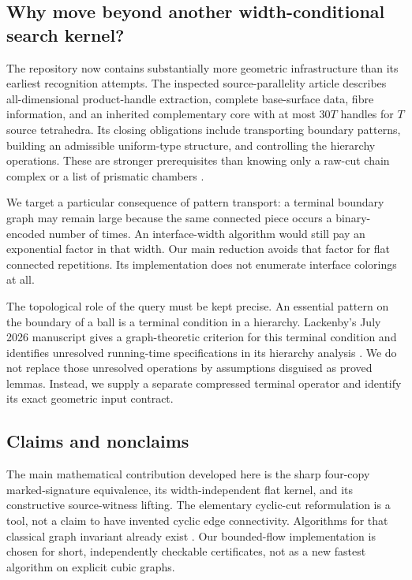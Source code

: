 \documentclass[11pt]{article}
\theoremstyle{remark}\newtheorem{remark}[theorem]{Remark}
\begin{document}
\subsection{Why move beyond another width-conditional search kernel?}
The repository now contains substantially more geometric infrastructure than its earliest recognition attempts. The inspected source-parallelity article describes all-dimensional product-handle extraction, complete base-surface data, fibre information, and an inherited complementary core with at most $30T$ handles for $T$ source tetrahedra. Its closing obligations include transporting boundary patterns, building an admissible uniform-type structure, and controlling the hierarchy operations. These are stronger prerequisites than knowing only a raw-cut chain complex or a list of prismatic chambers \cite{repo-parallelity}.

We target a particular consequence of pattern transport: a terminal boundary graph may remain large because the same connected piece occurs a binary-encoded number of times. An interface-width algorithm would still pay an exponential factor in that width. Our main reduction avoids that factor for flat connected repetitions. Its implementation does not enumerate interface colorings at all.

The topological role of the query must be kept precise. An essential pattern on the boundary of a ball is a terminal condition in a hierarchy. Lackenby's July 2026 manuscript gives a graph-theoretic criterion for this terminal condition and identifies unresolved running-time specifications in its hierarchy analysis \cite{lackenby2026}. We do not replace those unresolved operations by assumptions disguised as proved lemmas. Instead, we supply a separate compressed terminal operator and identify its exact geometric input contract.

\subsection{Claims and nonclaims}
The main mathematical contribution developed here is the sharp four-copy marked-signature equivalence, its width-independent flat kernel, and its constructive source-witness lifting. The elementary cyclic-cut reformulation is a tool, not a claim to have invented cyclic edge connectivity. Algorithms for that classical graph invariant already exist \cite{cyclic2004}. Our bounded-flow implementation is chosen for short, independently checkable certificates, not as a new fastest algorithm on explicit cubic graphs.
\end{document}
